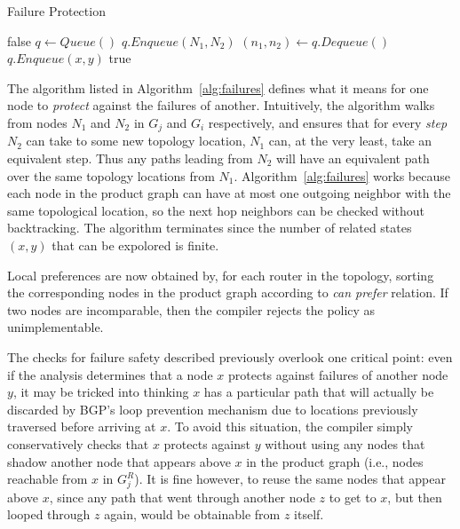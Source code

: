 \begin{algorithm}[t!]
\caption{Failure Protection}
\label{alg:failures}
\begin{algorithmic}[1]
   \Return false
  \EndIf
  \State $q \gets Queue()$
  \State $q.Enqueue (N_1, N_2)$
    \State $(n_1,n_2) \gets q.Dequeue()$
          \State $q.Enqueue(x,y)$
        \EndIf
      \EndIf
    \EndFor
  \EndWhile
  \Return true
  \EndProcedure
\end{algorithmic}
\end{algorithm}

The algorithm listed in Algorithm~\ref{alg:failures} defines what it means for one node to \textit{protect} against the failures of another. Intuitively, the algorithm walks from nodes $N_1$ and $N_2$ in $G_j$ and $G_i$ respectively, and ensures that for every \textit{step} $N_2$ can take to some new topology location, $N_1$ can, at the very least, take an equivalent step. Thus any paths leading from $N_2$ will have an equivalent path over the same topology locations from $N_1$. Algorithm~\ref{alg:failures} works because each node in the product graph can have at most one outgoing neighbor with the same topological location, so the next hop neighbors can be checked without backtracking. The algorithm terminates since the number of related states $(x,y)$ that can be expolored is finite.

Local preferences are now obtained by, for each router in the topology, sorting the corresponding nodes in the product graph according to \textit{can prefer} relation. If two nodes are incomparable, then the compiler rejects the policy as unimplementable.


The checks for failure safety described previously overlook one critical point: even if the analysis determines that a node $x$ protects against failures of another node $y$, it may be tricked into thinking $x$ has a particular path that will actually be discarded by BGP's loop prevention mechanism due to locations previously traversed before arriving at $x$. To avoid this situation, the compiler simply conservatively checks that $x$ protects against $y$ without using any nodes that shadow another node that appears above $x$ in the product graph (i.e., nodes reachable from $x$ in $G_j^R$). It is fine however, to reuse the same nodes that appear above $x$, since any path that went through another node $z$ to get to $x$, but then looped through $z$ again, would be obtainable from $z$ itself.


